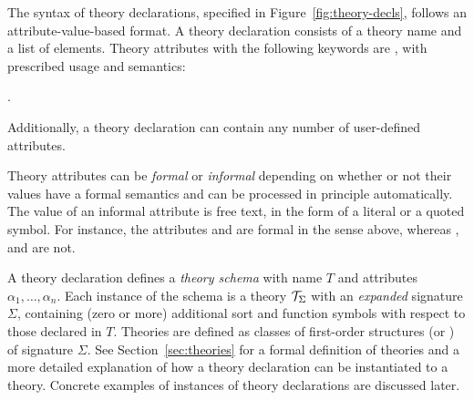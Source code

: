 The syntax of theory declarations, specified in Figure~\ref{fig:theory-decls},
follows an attribute-value-based format.
A theory declaration consists of a theory name and a list of  elements.
Theory attributes with the following keywords are 
, with prescribed usage and semantics:
\begin{center}
\qquad
{}\qquad
{}\qquad

\qquad
{}\qquad
{}\qquad
{} .
\end{center}
Additionally, 
a theory declaration can contain any number of user-defined attributes.

Theory attributes can be \emph{formal} or \emph{informal} depending on 
whether or not their values have a formal semantics and can be processed 
in principle automatically.
The value of an informal attribute is free text, 
in the form of a  literal or a quoted symbol.
For instance, 
the attributes  and  are formal in the sense above,
whereas ,  and 
are not.

A theory declaration 
defines a \emph{theory schema} with name $T$ and attributes $\alpha_1, \ldots, \alpha_n$.
Each instance of the schema is a theory $\mathcal{T}_\Sigma$
with an \emph{expanded} signature $\Sigma$,
containing (zero or more) additional sort and function symbols
with respect to those declared in $T$.
Theories are defined as classes of first-order structures (or )
of signature $\Sigma$.
See Section~\ref{sec:theories} for a formal definition of theories and 
a more detailed explanation of how a theory declaration can be instantiated 
to a theory.
Concrete examples of instances of theory declarations are discussed later.


